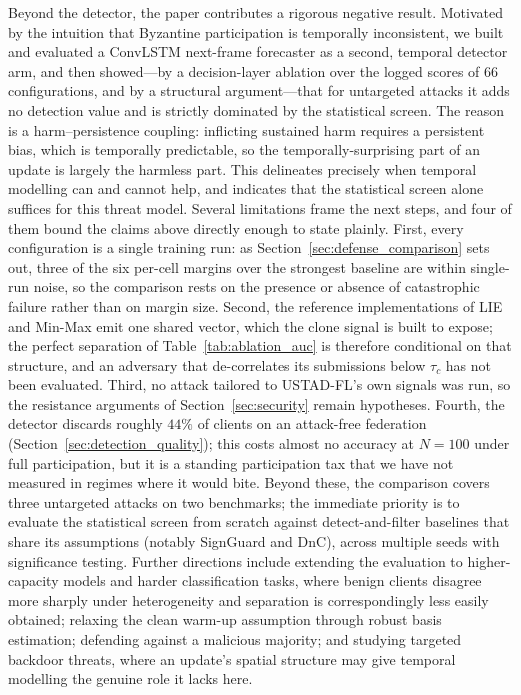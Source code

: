 \documentclass[journal]{IEEEtran}
\begin{document}
Beyond the detector, the paper contributes a rigorous negative result. Motivated by the intuition that Byzantine participation is temporally inconsistent, we built and evaluated a ConvLSTM next-frame forecaster as a second, temporal detector arm, and then showed---by a decision-layer ablation over the logged scores of $66$ configurations, and by a structural argument---that for untargeted attacks it adds no detection value and is strictly dominated by the statistical screen. The reason is a harm--persistence coupling: inflicting sustained harm requires a persistent bias, which is temporally predictable, so the temporally-surprising part of an update is largely the harmless part. This delineates precisely when temporal modelling can and cannot help, and indicates that the statistical screen alone suffices for this threat model. Several limitations frame the next steps, and four of them bound the claims above directly enough to state plainly. First, every configuration is a single training run: as Section~\ref{sec:defense_comparison} sets out, three of the six per-cell margins over the strongest baseline are within single-run noise, so the comparison rests on the presence or absence of catastrophic failure rather than on margin size. Second, the reference implementations of LIE and Min-Max emit one shared vector, which the clone signal is built to expose; the perfect separation of Table~\ref{tab:ablation_auc} is therefore conditional on that structure, and an adversary that de-correlates its submissions below $\tau_c$ has not been evaluated. Third, no attack tailored to USTAD-FL's own signals was run, so the resistance arguments of Section~\ref{sec:security} remain hypotheses. Fourth, the detector discards roughly $44\%$ of clients on an attack-free federation (Section~\ref{sec:detection_quality}); this costs almost no accuracy at $N=100$ under full participation, but it is a standing participation tax that we have not measured in regimes where it would bite. Beyond these, the comparison covers three untargeted attacks on two benchmarks; the immediate priority is to evaluate the statistical screen from scratch against detect-and-filter baselines that share its assumptions (notably SignGuard and DnC), across multiple seeds with significance testing. Further directions include extending the evaluation to higher-capacity models and harder classification tasks, where benign clients disagree more sharply under heterogeneity and separation is correspondingly less easily obtained; relaxing the clean warm-up assumption through robust basis estimation; defending against a malicious majority; and studying targeted backdoor threats, where an update's spatial structure may give temporal modelling the genuine role it lacks here.
\end{document}
